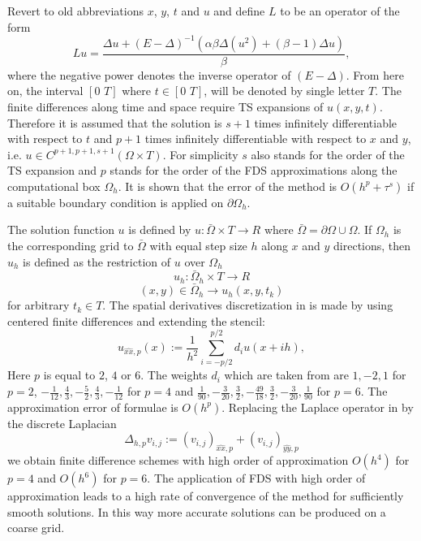 \documentclass[11pt,a4paper,twoside]{article}
\begin{document}
Revert to old abbreviations $x$, $y$, $t$ and $u$ and define $L$ to be an operator of the form
\begin{equation}\label{operator}
Lu = \frac{\Delta u + (E-\Delta)^{-1} ( \alpha \beta \Delta( u^2) + (\beta -1)\Delta u)}{\beta},
\end{equation}
where the negative power denotes the inverse operator of $(E-\Delta)$. From here on, the interval $[0\,\, T]$ where $t \in [0\,\, T]$, will be denoted by single letter $T$. The finite differences along time and space require TS expansions of $u(x,y,t)$. Therefore it is assumed that the solution is $s+1$ times infinitely differentiable with respect to $t$ and $p+1$ times infinitely differentiable with respect to $x$ and $y$, i.e. $u \in C^{p+1,p+1,s+1}(\Omega \times T)$. For simplicity $s$ also stands for the order of the TS expansion and $p$ stands for the order of the FDS approximations along the computational box $\Omega_h$. It is shown that the error of the method is $O(h^p + \tau^s)$ if a suitable boundary condition is applied on $\partial \Omega_h$.

The solution function $u$ is defined by $u : \bar \Omega \times T \rightarrow  R$ where $\bar \Omega = \partial \Omega \cup \Omega$. If $\Omega_h$ is the corresponding grid to $\bar \Omega$ with equal step size $h$ along $x$ and $y$ directions, then $u_h$ is defined as the restriction of $u$ over $\Omega_h$
$$u_h : \bar \Omega_h \times T \rightarrow  R$$
$$ (x,y) \in \bar \Omega_h \rightarrow u_h(x,y, t_k)$$
for arbitrary $t_k \in T$. The spatial derivatives discretization in  is made by using centered finite differences and extending the stencil:
\begin{equation}\label{fd}
u_{\widehat{xx},p}(x) :=  \frac{1}{h^2} \sum\limits_{i=-p/2}^{p/2} d_i u(x+ih),
\end{equation}
 Here $p$ is equal to $2$, $4$ or $6$.  The weights $d_i$ which are taken from \cite{forn} are  
 $ 1,-2,1$ for $p=2$, $-\frac{1}{12}, \frac{4}{3}, -\frac{5}{2}, \frac{4}{3}, -\frac{1}{12}$ for $p=4$ and  $\frac{1}{90}, -\frac{3}{20}, \frac{3}{2}, -\frac{49}{18}, \frac{3}{2}, -\frac{3}{20}, \frac{1}{90}$ for $p=6$. The approximation error of  formulae  is $O(h^p)$. Replacing the Laplace operator in  by the discrete Laplacian 
$$ \Delta_{h,p} v_{i,j} := (v_{i,j})_{\widehat{xx},p} + (v_{i,j})_{\widehat{yy},p}$$ 
we obtain finite difference schemes with high order of approximation $O(h^4)$ for $p=4$ and  $O(h^6)$ for $p=6 $.  The application of FDS with high order of approximation leads to a high rate of convergence of the method for sufficiently smooth solutions. In this way more accurate solutions can be produced on a coarse grid. 
\end{document}
